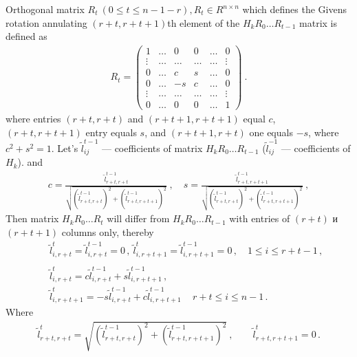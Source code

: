 \documentclass[12pt, a4paper, notitlepage]{article}
\begin{document}
Orthogonal matrix $R_t \ (0 \le t \le n - 1 -r), R_t \in R^{n \times n}$ which defines the Givens rotation
annulating  \mbox{$(r+t , r+t+1)$}th element of the $H_k R_0 \dots R_{t-1}$ matrix is defined as
\begin{eqnarray*}
    R_t = \left( \begin{array}{cccccc}
   1      & \ldots & 0      & 0      & \ldots & 0 \\
   \vdots & \ldots & \ldots & \ldots & \ldots & \vdots \\
   0      & \ldots & c      & s      & \ldots & 0 \\
   0      & \ldots & -s     & c      & \ldots & 0 \\
   \vdots & \ldots & \ldots & \ldots & \ldots & \vdots \\
   0      & \ldots & 0      & 0      & \ldots & 1
    \end{array}
     \right) \ .
\end{eqnarray*}
where entries $( r+t , r+t )$ and $( r+t+1 , r+t+1 )$ equal $c$,  $( r+t , r+t+1 )$ entry equals $s$, and
   $( r+t+1 , r+t )$ one equals $-s$, where $c^2 + s^2 = 1$.
   Let's $\tilde l_{ij}^{t-1}$ --- coefficients of matrix $H_k R_0 \dots R_{t-1}$
   ($\tilde l_{ij}^{-1}$ --- coefficients of $H_k$).
   and
\begin{eqnarray*}
  c = \frac{ \tilde l_{r+t,r+t}^{t-1} }
{ \sqrt{ (\tilde l_{r+t,r+t}^{t-1})^2 + (\tilde l_{r+t,r+t+1}^{t-1})^2 } } \ ,
\quad
  s = \frac{ \tilde l_{r+t,r+t+1}^{t-1} }
{ \sqrt{ (\tilde l_{r+t,r+t}^{t-1})^2 + (\tilde l_{r+t,r+t+1}^{t-1})^2 } } \ ,
\end{eqnarray*}
  Then matrix $H_k R_0 \dots R_t$ will differ from $H_k R_0 \dots R_{t-1}$  with entries of $( r+t )$ и $( r+t+1 )$ columns only,
  thereby
\begin{eqnarray*}
 &&  \tilde l_{i,r+t}^t = \tilde l_{i,r+t}^{t-1} = 0 \, , \
     \tilde l_{i,r+t+1}^t = \tilde l_{i,r+t+1}^{t-1} = 0 \, ,
     \quad   1 \le i \le r + t  - 1  \, ,
\\
\\
 &&  \tilde l_{i,r+t}^t = c \tilde l_{i,r+t}^{t-1} +  s \tilde l_{i,r+t+1}^{t-1} \, ,
\\
\nonumber
 &&  \tilde l_{i,r+t+1}^t = -s \tilde l_{i,r+t}^{t-1} +  c \tilde l_{i,r+t+1}^{t-1} \,
     \quad  r + t \le i \le n - 1 \, .
\end{eqnarray*}
   Where
\begin{eqnarray*}
  \tilde l_{r+t,r+t}^t =
\sqrt{ (\tilde l_{r+t,r+t}^{t-1})^2 + (\tilde l_{r+t,r+t+1}^{t-1})^2 } \ ,
\qquad
  \tilde l_{r+t,r+t+1}^t = 0   \,  .
\end{eqnarray*}
\end{document}
